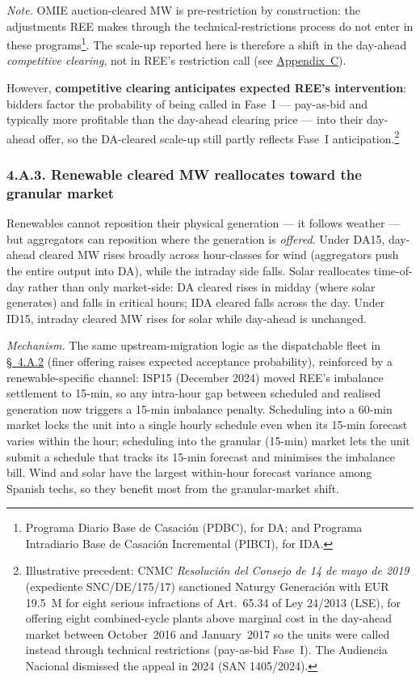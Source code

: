 \documentclass[11pt]{article}
\begin{document}
\emph{Note.} OMIE auction-cleared MW is pre-restriction by construction: the adjustments REE makes through the technical-restrictions process do not enter in these programs\footnote{Programa Diario Base de Casación (PDBC), for DA; and Programa Intradiario Base de Casación Incremental (PIBCI), for IDA.}. The scale-up reported here is therefore a shift in the day-ahead \emph{competitive clearing}, not in REE's restriction call (see \hyperref[sec:context]{Appendix~C}).

However, \textbf{competitive clearing anticipates expected REE's intervention}: bidders factor the probability of being called in Fase~I --- pay-as-bid and typically more profitable than the day-ahead clearing price --- into their day-ahead offer, so the DA-cleared scale-up still partly reflects Fase~I anticipation.\footnote{Illustrative precedent: CNMC \emph{Resoluci\'on del Consejo de 14 de mayo de 2019} (expediente SNC/DE/175/17) sanctioned Naturgy Generaci\'on with EUR 19.5~M for eight serious infractions of Art.~65.34 of Ley 24/2013 (LSE), for offering eight combined-cycle plants above marginal cost in the day-ahead market between October~2016 and January~2017 so the units were called instead through technical restrictions (pay-as-bid Fase~I). The Audiencia Nacional dismissed the appeal in 2024 (SAN 1405/2024).}

\subsubsection*{4.A.3. Renewable cleared MW reallocates toward the granular market}\label{sec:4-renewable}
Renewables cannot reposition their physical generation --- it follows weather --- but aggregators can reposition where the generation is \emph{offered}. Under DA15, day-ahead cleared MW rises broadly across hour-classes for wind (aggregators push the entire output into DA), while the intraday side falls. Solar reallocates time-of-day rather than only market-side: DA cleared rises in midday (where solar generates) and falls in critical hours; IDA cleared falls across the day. Under ID15, intraday cleared MW rises for solar while day-ahead is unchanged.

\emph{Mechanism.} The same upstream-migration logic as the dispatchable fleet in \hyperref[sec:4iii]{\S~4.A.2} (finer offering raises expected acceptance probability), reinforced by a renewable-specific channel: ISP15 (December 2024) moved REE's imbalance settlement to 15-min, so any intra-hour gap between scheduled and realised generation now triggers a 15-min imbalance penalty. Scheduling into a 60-min market locks the unit into a single hourly schedule even when its 15-min forecast varies within the hour; scheduling into the granular (15-min) market lets the unit submit a schedule that tracks its 15-min forecast and minimises the imbalance bill. Wind and solar have the largest within-hour forecast variance among Spanish techs, so they benefit most from the granular-market shift.
\end{document}
